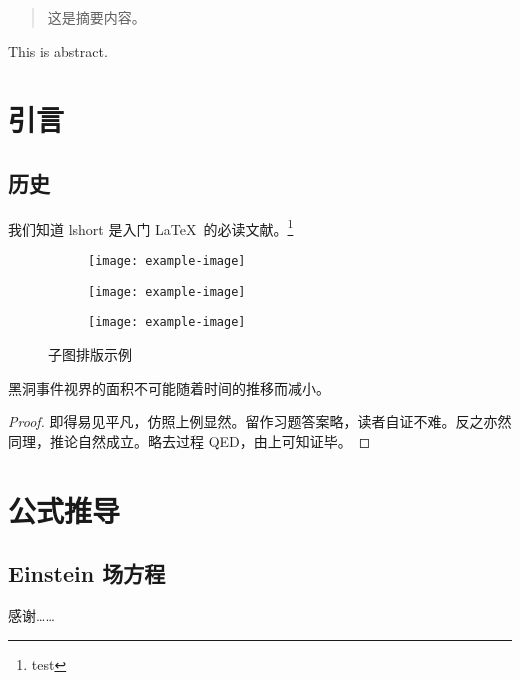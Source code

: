\documentclass[bachelor,format=ncu,newenv]{ncuthesis}
\begin{document}
\maketitle
\frontmatter
\makedecaut
\begin{abstract}
这是摘要内容。
\end{abstract}
\begin{abstract*}
This is abstract.
\end{abstract*}
\tableofcontents
\mainmatter
\chapter{引言}
\section{历史}
我们知道 lshort\cite{lshortcn} 是入门 \LaTeX\ 的必读文献。\footnote{test}

\begin{figure}[htb]
\centering
\begin{subfigure}{.45\textwidth}
\centering
\texttt{[image: example-image]}
\label{fig:subfigexp-a}
\end{subfigure}
\begin{subfigure}{.45\textwidth}
\centering
\texttt{[image: example-image]}
\label{fig:subfigexp-b}
\end{subfigure}
\begin{subfigure}{.45\textwidth}
\centering
\texttt{[image: example-image]}
\label{fig:subfigexp-c}
\end{subfigure}
\caption{子图排版示例}
\label{fig:subfig}
\end{figure}

\begin{law}[黑洞面积定律]
黑洞事件视界的面积不可能随着时间的推移而减小。
\end{law}
\begin{proof}
即得易见平凡，仿照上例显然。留作习题答案略，读者自证不难。反之亦然同理，推论自然成立。略去过程 QED，由上可知证毕。
\end{proof}
\appendix
\chapter{公式推导}
\section{Einstein 场方程}
\backmatter

\begin{acknowledgements}
感谢……
\end{acknowledgements}
\end{document}
